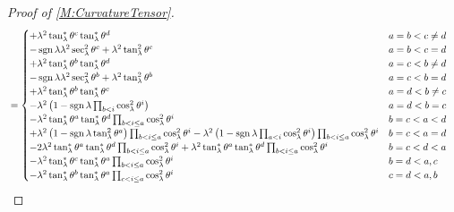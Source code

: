 \documentclass[../methodology.tex]{subfiles}
\begin{document}
\begin{proof}[Proof of \cref{M:CurvatureTensor}]
\begin{align*}
     & =\begin{cases}
          +\lambda^2\tan_\lambda^\ast\tensor{\theta}{^c}\tan_\lambda^\ast\tensor{\theta}{^d}
            & \text{\(a=b<c\ne d\)} \\
          -\sign{\lambda}\lambda^2\sec_\lambda^2\tensor{\theta}{^c}
          +\lambda^2\tan_\lambda^2\tensor{\theta}{^c}
            & \text{\(a=b<c=d\)}    \\
          +\lambda^2\tan_\lambda^\ast\tensor{\theta}{^b}\tan_\lambda^\ast\tensor{\theta}{^d}
            & \text{\(a=c<b\ne d\)} \\
          -\sign{\lambda}\lambda^2\sec^2_\lambda\tensor{\theta}{^b}
          +\lambda^2\tan_\lambda^2\tensor{\theta}{^b}
            & \text{\(a=c<b=d\)}    \\
          +\lambda^2\tan_\lambda^\ast\tensor{\theta}{^b}\tan_\lambda^\ast\tensor{\theta}{^c}
            & \text{\(a=d<b\ne c\)} \\
          -\lambda^2
          \left(
          1-\sign{\lambda}\prod_{b<i}\cos_\lambda^2\tensor{\theta}{^i}
          \right)
            & \text{\(a=d<b=c\)}    \\
          -\lambda^2\tan_\lambda^\ast\tensor{\theta}{^a}\tan_\lambda^\ast\tensor{\theta}{^d}\prod_{b<i\le a}\cos_\lambda^2\tensor{\theta}{^i}
            & \text{\(b=c<a<d\)}    \\
          +\lambda^2\left(1-\sign{\lambda}\tan_\lambda^2\tensor{\theta}{^a}\right)\prod_{b<i\le a}{\cos_\lambda^2\tensor{\theta}{^i}}
          -\lambda^2
          \left(
          1-\sign{\lambda}\prod_{a<i}\cos_\lambda^2\tensor{\theta}{^i}
          \right)
          \prod_{b<i\le a}\cos_\lambda^2\tensor{\theta}{^i}
            & \text{\(b=c<a=d\)}    \\
          -2\lambda^2\tan_\lambda^\ast\tensor{\theta}{^a}\tan_\lambda^\ast\tensor{\theta}{^d}\prod_{b<i\le a}{\cos_\lambda^2\tensor{\theta}{^i}}
          +\lambda^2\tan_\lambda^\ast\tensor{\theta}{^a}\tan_\lambda^\ast\tensor{\theta}{^d}\prod_{b<i\le a}\cos_\lambda^2\tensor{\theta}{^i}
            & \text{\(b=c<d<a\)}    \\
          -\lambda^2\tan_\lambda^\ast\tensor{\theta}{^c}\tan_\lambda^\ast\tensor{\theta}{^a}\prod_{b<i\le a}\cos_\lambda^2\tensor{\theta}{^i}
            & \text{\(b=d<a,c\)}    \\
          -\lambda^2\tan_\lambda^\ast\tensor{\theta}{^b}\tan_\lambda^\ast\tensor{\theta}{^a}\prod_{c<i\le a}\cos_\lambda^2\tensor{\theta}{^i}
            & \text{\(c=d<a,b\)}    \\

\end{cases}
\end{align*}
\end{proof}
\end{document}
